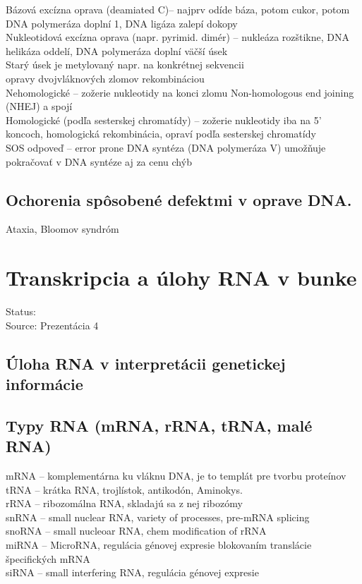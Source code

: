 Bázová excízna oprava (deamiated C)-- najprv odíde báza, potom cukor, potom DNA polymeráza doplní 1, DNA ligáza zalepí dokopy\\
Nukleotidová excízna oprava (napr. pyrimid. dimér) -- nukleáza rozštikne, DNA helikáza oddelí, DNA polymeráza doplní väčší úsek\\
Starý úsek je metylovaný napr. na konkrétnej sekvencii\\

opravy dvojvláknových zlomov rekombináciou\\
\tab Nehomologické -- zožerie nukleotidy na konci zlomu Non-homologous end joining (NHEJ) a spojí\\
\tab Homologické (podľa sesterskej chromatídy) -- zožerie nukleotidy iba na 5' koncoch, homologická rekombinácia, opraví podľa sesterskej chromatídy\\

SOS odpoveď -- error prone DNA syntéza (DNA polymeráza V) umožňuje pokračovať v DNA syntéze aj za cenu chýb\\
\subsection*{Ochorenia spôsobené defektmi v oprave DNA. }
Ataxia, Bloomov syndróm

\section{Transkripcia a úlohy RNA v bunke}

Status: \\
Source: Prezentácia 4\\

\subsection*{Úloha RNA v interpretácii genetickej informácie}

\subsection*{Typy RNA (mRNA, rRNA, tRNA, malé RNA)}
mRNA -- komplementárna ku vláknu DNA, je to templát pre tvorbu proteínov\\
tRNA -- krátka RNA, trojlístok, antikodón, Aminokys. \\
rRNA -- ribozomálna RNA, skladajú sa z nej ribozómy\\
snRNA -- small nuclear RNA, variety of processes, pre-mRNA splicing\\
snoRNA -- small nucleoar RNA, chem modification of rRNA\\
miRNA -- MicroRNA, regulácia génovej expresie blokovaním translácie špecifických mRNA\\
siRNA -- small interfering RNA, regulácia génovej expresie\\
